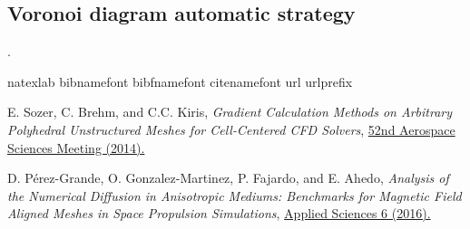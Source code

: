 \documentclass[]{article}
\begin{document}
\subsection*{Voronoi diagram automatic strategy}
.
\begin{thebibliography}{19}

\expandafter\ifx\csname natexlab\endcsname\relax\def\natexlab#1{#1}\fi
\expandafter\ifx\csname bibnamefont\endcsname\relax
  \def\bibnamefont#1{#1}\fi
\expandafter\ifx\csname bibfnamefont\endcsname\relax
  \def\bibfnamefont#1{#1}\fi
\expandafter\ifx\csname citenamefont\endcsname\relax
  \def\citenamefont#1{#1}\fi
\expandafter\ifx\csname url\endcsname\relax
  \def\url#1{\texttt{#1}}\fi
\expandafter\ifx\csname urlprefix\endcsname\relax\def\urlprefix{URL }\fi
\providecommand{\bibinfo}[2]{#2}
\providecommand{\eprint}[2][]{\url{#2}}


\bibinfo{author}{\bibfnamefont{E. Sozer}},
\bibinfo{author}{\bibfnamefont{C. Brehm}},
\bibnamefont{and}
\bibinfo{author}{\bibfnamefont{C.C. Kiris}},
\emph{\bibinfo{title}{Gradient Calculation Methods on Arbitrary Polyhedral Unstructured Meshes for Cell-Centered CFD Solvers}},
\href{http://dx.doi.org/10.2514/6.2014-1440}{
\bibinfo{journal}{52nd Aerospace Sciences Meeting} 
(\bibinfo{year}{2014}).}


\bibinfo{author}{\bibfnamefont{D. P{\'{e}}rez-Grande}},
\bibinfo{author}{\bibfnamefont{O. Gonzalez-Martinez}},
\bibinfo{author}{\bibfnamefont{P. Fajardo}},
\bibnamefont{and}
\bibinfo{author}{\bibfnamefont{E. Ahedo}},
\emph{\bibinfo{title}{Analysis of the Numerical Diffusion in Anisotropic Mediums: Benchmarks for Magnetic Field Aligned Meshes in Space Propulsion Simulations}},
\href{https://doi.org/10.3390/app6110354}{
\bibinfo{journal}{Applied Sciences}
\bibinfo{volume}{6}
(\bibinfo{year}{2016}).}





\end{thebibliography}
\end{document}
